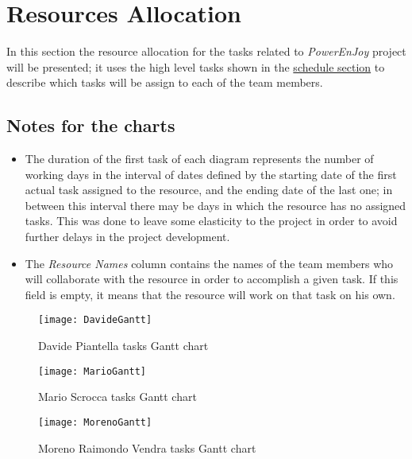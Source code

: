 \section{Resources Allocation}\label{sec:resAlloc}
In this section the resource allocation for the tasks related to \emph{PowerEnJoy} project will be presented; it uses the high level tasks shown in the \hyperref[sec:schedule]{schedule section} to describe which tasks will be assign to each of the team members.

\subsection{Notes for the charts}
\begin{itemize}
	\item The duration of the first task of each diagram represents the number of working days in the interval of dates defined by the starting date of the first actual task assigned to the resource, and the ending date of the last one; in between this interval there may be days in which the resource has no assigned tasks. This was done to leave some elasticity to the project in order to avoid further delays in the project development.
	\item The \emph{Resource Names} column contains the names of the team members who will collaborate with the resource in order to accomplish a given task. If this field is empty, it means that the resource will work on that task on his own.
\end{itemize}

\begin{figure}[h]
	\centering
	\texttt{[image: DavideGantt]}	\caption{
		\label{fig:davideGantt} 
		Davide Piantella tasks Gantt chart
	}
	
\end{figure}\begin{figure}[h]
	\centering
	\texttt{[image: MarioGantt]}	\caption{
		\label{fig:marioGantt} 
		Mario Scrocca tasks Gantt chart
	}
	
\end{figure}\begin{figure}[h]
	\centering
	\texttt{[image: MorenoGantt]}	\caption{
		\label{fig:morenoGantt} 
		Moreno Raimondo Vendra tasks Gantt chart
	}
\end{figure}
